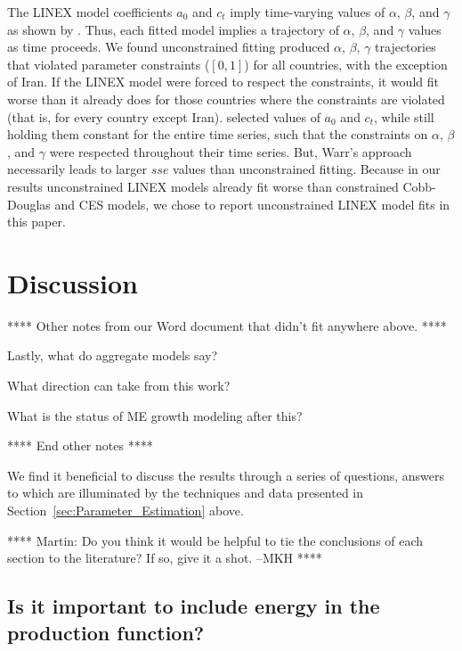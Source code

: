 \documentclass[preprint,authoryear,12pt]{elsarticle}\usepackage[]{graphicx}\usepackage[]{color}
\begin{document}
The LINEX model coefficients $a_0$ and $c_t$ imply time-varying
values of $\alpha$, $\beta$, and $\gamma$ as shown by \citet[Equations~7]{Warr:2012cg}.
Thus, each fitted model implies a trajectory of $\alpha$, $\beta$, and $\gamma$ values as time proceeds.
We found unconstrained fitting produced $\alpha$, $\beta$, $\gamma$ trajectories
that violated parameter constraints ($[0,1]$) for all countries, with the exception of Iran.
If the LINEX model were forced to respect the constraints,
it would fit worse than it already does for those countries where
the constraints are violated (that is, for every country except Iran).
\citet{Warr:2012cg} selected values of $a_0$ and $c_t$, while still holding them constant
for the entire time series, such that the constraints on $\alpha$, $\beta$, and $\gamma$
were respected throughout their time series.
But, Warr's approach necessarily leads to larger $sse$ values than unconstrained fitting.
Because in our results unconstrained LINEX models already fit worse than 
constrained Cobb-Douglas and CES models,
we chose to report unconstrained LINEX model fits in this paper.


\section{Discussion}
\label{sec:Discussion}


**** Other notes from our Word document that didn't fit anywhere above. ****

Lastly, what do aggregate models say? 

What direction can take from this work? 

What is the status of ME growth modeling after this?

**** End other notes ****

We find it beneficial to discuss the results through a series of questions, 
answers to which are illuminated by the techniques and data presented
in Section~\ref{sec:Parameter_Estimation} above.

**** Martin: Do you think it would be helpful to tie the conclusions 
of each section to the literature? 
If so, give it a shot. --MKH ****


\subsection{Is it important to include energy in the production function?} 
\label{sec:important_to_include_energy}
\end{document}
